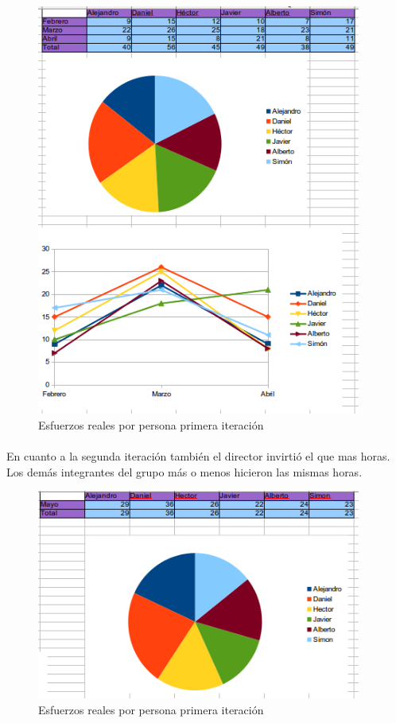 \begin{figure}[h!]
\centering
\includegraphics[width=0.95\textwidth]{img/6171}
\caption{Esfuerzos reales por persona primera iteración}
 \label{fig:6171}
\end{figure} 

\paragraph{} En cuanto a la segunda iteración también el director invirtió el que mas horas. Los demás integrantes del grupo más o menos hicieron las mismas horas.

\begin{figure}[h!]
\centering
\includegraphics[width=0.95\textwidth]{img/6172}
\caption{Esfuerzos reales por persona primera iteración}
 \label{fig:6172}
\end{figure} 